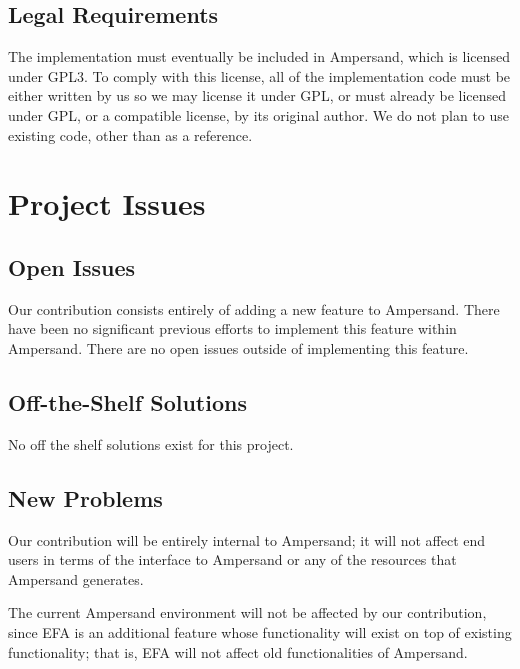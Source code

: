 \documentclass[12pt]{report}
\begin{document}
\section{Legal Requirements}\label{sec:Legal}
The implementation must eventually be included in Ampersand, which is licensed
under GPL3. To comply with this license, all of the implementation code must be
either written by us so we may license it under GPL, or must already be licensed
under GPL, or a compatible license, by its original author. We do not plan to
use existing code, other than as a reference.
%
%

\chapter{Project Issues}\label{ch:issues}
\section{Open Issues}\label{sec:issues}
Our contribution consists entirely of adding a new feature to Ampersand. There
have been no significant previous efforts to implement this feature within
Ampersand. There are no open issues outside of implementing this feature. 
%
\section{Off-the-Shelf Solutions}\label{sec:solutions}
No off the shelf solutions exist for this project.
\section{New Problems}\label{sec:NewProblems}
Our contribution will be entirely internal to Ampersand; it will not affect end
users in terms of the interface to Ampersand or any of the resources that
Ampersand generates. 

The current Ampersand environment will not be affected by our contribution,
since EFA is an additional feature whose functionality will exist on top of
existing functionality; that is, EFA will not affect old functionalities of
Ampersand.
\end{document}
